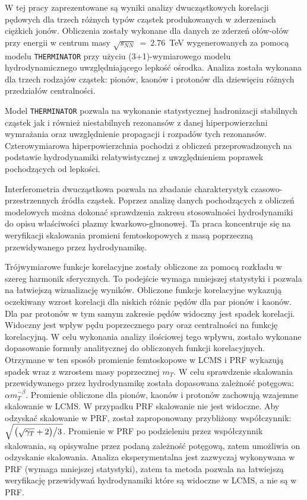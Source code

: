 W tej pracy zaprezentowane są wyniki analizy dwucząstkowych korelacji pędowych dla trzech różnych typów cząstek produkowanych w zderzeniach ciężkich jonów.
Obliczenia zostały wykonane dla danych ze zderzeń ołów-ołów przy energii w centrum masy $\sqrt{s_{NN}}~=~2.76$~TeV wygenerowanych za pomocą modelu \verb|THERMINATOR| przy użyciu (3+1)-wymiarowego modelu hydrodynamicznego uwzględniającego lepkość ośrodka.
Analiza została wykonana dla trzech rodzajów cząstek: pionów, kaonów i protonów dla dziewięciu różnych przedziałów centralności.

Model \verb|THERMINATOR| pozwala na wykonanie statystycznej hadronizacji stabilnych cząstek jak i również niestabilnych rezonansów z danej hiperpowierzchni wymrażania oraz uwzględnienie propagacji i rozpadów tych rezonansów.
Czterowymiarowa hiperpowierzchnia pochodzi z obliczeń przeprowadzonych na podstawie hydrodynamiki relatywistycznej z uwzględnieniem poprawek pochodzących od lepkości.

Interferometria dwucząstkowa pozwala na zbadanie charakterystyk czasowo-przestrzennych źródła cząstek.
Poprzez analizę danych pochodzących z obliczeń modelowych można dokonać sprawdzenia zakresu stosowalności hydrodynamiki do opisu właściwości plazmy kwarkowo-gluonowej.
Ta praca koncentruje się na weryfikacji skalowania promieni femtoskopowych z masą poprzeczną przewidywanego przez hydrodynamikę.

Trójwymiarowe funkcje korelacyjne zostały obliczone za pomocą rozkładu w szereg harmonik sferycznych.
To podejście wymaga mniejszej statystyki i pozwala na łatwiejszą wizualizację wyników.
Obliczone funkcje korelacyjne wykazują oczekiwany wzrost korelacji dla niskich różnic pędów dla par pionów i kaonów.
Dla par protonów w tym samym zakresie pędów widoczny jest spadek korelacji.
Widoczny jest wpływ pędu poprzecznego pary oraz centralności na funkcję korelacyjną.
W celu wykonania analizy ilościowej tego wpływu, zostało wykonane dopasowanie formuły analitycznej do obliczonych funkcji korelacyjnych.
Otrzymane w ten sposób promienie femtoskopowe w LCMS i PRF wykazują spadek wraz z wzrostem masy poprzecznej $m_T$.
W celu sprawdzenie skalowania przewidywanego przez hydrodynamikę została dopasowana zależność potęgowa: $\alpha m_T^{-\beta}$.
Promienie obliczone dla pionów, kaonów i protonów zachowują wzajemne skalowanie w LCMS.
W przypadku PRF skalowanie nie jest widoczne.
Aby odzyskać skalowanie w PRF, został zaproponowany przybliżony współczynnik: $\sqrt{ \left. \left( \sqrt{\gamma_T} + 2 \right) \middle/ 3 \right. }$.
Promienie w PRF po podzieleniu przez współczynnik skalowania, są opisywalne przez podaną zależność potęgową, zatem umożliwia on odzyskanie skalowania.
Analiza eksperymentalna jest zazwyczaj wykonywana w PRF (wymaga mniejszej statystyki), zatem ta metoda pozwala na łatwiejszą weryfikację przewidywań hydrodynamiki które są widoczne w LCMS, a nie są w PRF.